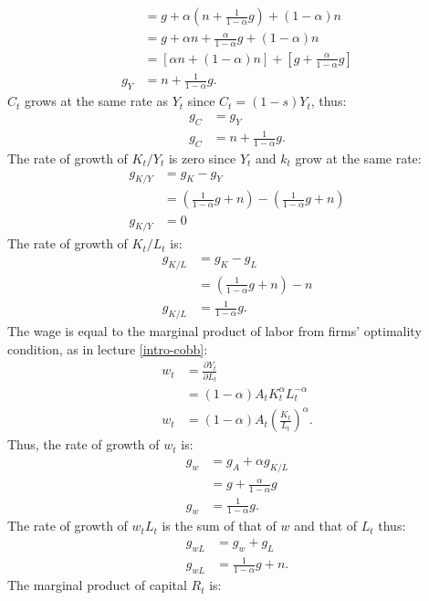 \documentclass[]{book}
\theoremstyle{definition}
\theoremstyle{definition}
\theoremstyle{definition}
\theoremstyle{remark}
\begin{document}
\begin{enumerate}
\[\begin{aligned}
  &= g+ \alpha\left(n+\frac{1}{1-\alpha}g\right)+(1-\alpha)n\\
  &= g+ \alpha n+\frac{\alpha}{1-\alpha}g+(1-\alpha)n \\
  &= \left[\alpha n+(1-\alpha)n\right] + \left[g+  \frac{\alpha}{1-\alpha}g\right] \\
  g_Y&=n+\frac{1}{1-\alpha}g.
  \end{aligned}
  \] \(C_t\) grows at the same rate as \(Y_t\) since \(C_t=(1-s)Y_t\),
  thus: \[
  \begin{aligned}
  g_C&=g_Y \\
  g_C&=n+\frac{1}{1-\alpha}g.
  \end{aligned}
  \] The rate of growth of \(K_t/Y_t\) is zero since \(Y_t\) and \(k_t\)
  grow at the same rate: \[
  \begin{aligned}
  g_{K/Y}&=g_K-g_Y\\
  &=\left(\frac{1}{1-\alpha}g + n\right)-\left(\frac{1}{1-\alpha}g + n\right)\\
  g_{K/Y}&=0
  \end{aligned}
  \] The rate of growth of \(K_t/L_t\) is: \[
  \begin{aligned}
  g_{K/L}&=g_K-g_L\\
  &= \left(\frac{1}{1-\alpha}g + n\right)-n \\
  g_{K/L}&=\frac{1}{1-\alpha}g.
  \end{aligned}
  \] The wage is equal to the marginal product of labor from firms'
  optimality condition, as in lecture \ref{intro-cobb}: \[
  \begin{aligned}
  w_t&=\frac{\partial Y_t}{\partial L_t}\\
  &=(1-\alpha)A_t K_t^\alpha L_t^{-\alpha}\\
  w_t&=(1-\alpha)A_t \left(\frac{K_t}{L_t}\right)^{\alpha}.
  \end{aligned}
  \] Thus, the rate of growth of \(w_t\) is: \[
  \begin{aligned}
  g_w&=g_A+\alpha g_{K/L}\\
  &=g+\frac{\alpha}{1-\alpha}g\\
  g_w&=\frac{1}{1-\alpha}g.
  \end{aligned}
  \] The rate of growth of \(w_t L_t\) is the sum of that of \(w\) and
  that of \(L_t\) thus: \[
  \begin{aligned}
  g_{wL}&=g_w + g_L \\
  g_{wL}&=\frac{1}{1-\alpha}g+n.
  \end{aligned}
  \] The marginal product of capital \(R_t\) is: \[
\]
\end{enumerate}
\end{document}
